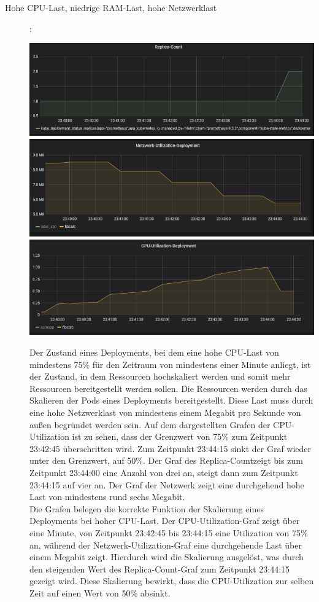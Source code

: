 \documentclass[a4paper,10pt]{scrartcl}
\begin{document}
\begin{description}

\item[Hohe CPU-Last, niedrige RAM-Last, hohe Netzwerklast]:\\

\begin{minipage}{\linewidth}
            \includegraphics[width=.5\textwidth]{img/CPUSkalierung/ReplicaCount.PNG}
            \includegraphics[scale=1,width=.5\textwidth,height=.14\textheight]{img/CPUSkalierung/Netzwerk.PNG}
  			\includegraphics[scale=1,width=.5\textwidth]{img/CPUSkalierung/CPUSaturation.PNG}
\end{minipage}

Der Zustand eines Deployments, bei dem eine hohe CPU-Last von mindestens 75\% für den Zeitraum von mindestens einer Minute anliegt, ist der Zustand, in dem Ressourcen hochskaliert werden und somit mehr Ressourcen bereitgestellt werden sollen. Die Ressourcen werden durch das Skalieren der Pods eines Deployments bereitgestellt. Diese Last muss durch eine hohe Netzwerklast von mindestens einem Megabit pro Sekunde von außen begründet werden sein.
Auf dem dargestellten Grafen der CPU-Utilization ist zu sehen, dass der Grenzwert von 75\% zum Zeitpunkt 23:42:45 überschritten wird. Zum Zeitpunkt 23:44:15 sinkt der Graf wieder unter den Grenzwert, auf 50\%. Der Graf des \glqq Replica-Count\grqq zeigt bis zum Zeitpunkt 23:44:00 eine Anzahl von drei an, steigt dann zum Zeitpunkt 23:44:15 auf vier an. Der Graf der Netzwerk zeigt eine durchgehend hohe Last von mindestens rund sechs Megabit.\\
Die Grafen belegen die korrekte Funktion der Skalierung eines Deployments bei hoher CPU-Last. Der CPU-Utilization-Graf zeigt über eine Minute, von Zeitpunkt 23:42:45 bis 23:44:15 eine Utilization von 75\% an, während der Netzwerk-Utilization-Graf eine durchgehende Last über einem Megabit zeigt. Hierdurch wird die Skalierung ausgelöst, was durch den steigenden Wert des \glqq Replica-Count\grqq -Graf zum Zeitpunkt 23:44:15 gezeigt wird. Diese Skalierung bewirkt, dass die CPU-Utilization zur selben Zeit auf einen Wert von 50\% absinkt.


\end{description}
\end{document}
